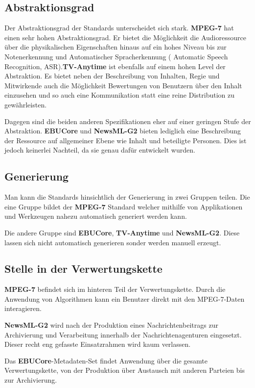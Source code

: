 	\subsection{Abstraktionsgrad}
Der Abstraktionsgrad der Standards unterscheidet sich stark. \textbf{MPEG-7} hat einen sehr hohen Abstraktionsgrad. Er bietet die Möglichkeit die Audioressource über die physikalischen Eigenschaften hinaus auf ein hohes Niveau bis zur Notenerkennung und Automatischer Spracherkennung ( Automatic Speech Recognition, ASR).\textbf{TV-Anytime} ist ebenfalls auf einem hohen Level der Abstraktion. Es bietet neben der Beschreibung von Inhalten, Regie und Mitwirkende auch die Möglichkeit Bewertungen von Benutzern über den Inhalt einzusehen und so auch eine Kommunikation statt eine reine Distribution zu gewährleisten.

	Dagegen sind die beiden anderen Spezifikationen eher auf einer geringen Stufe der Abstraktion. \textbf{EBUCore} und \textbf{NewsML-G2} bieten lediglich eine Beschreibung der Ressource auf allgemeiner Ebene wie Inhalt und beteiligte Personen. Dies ist jedoch keinerlei Nachteil, da sie genau dafür entwickelt wurden.

	\subsection{Generierung}
	Man kann die Standards hinsichtlich der Generierung in zwei Gruppen teilen. Die eine Gruppe bildet der \textbf{MPEG-7} Standard welcher mithilfe von Applikationen und Werkzeugen nahezu automatisch generiert werden kann.
	
	Die andere Gruppe sind \textbf{EBUCore}, \textbf{TV-Anytime} und \textbf{NewsML-G2}. Diese lassen sich nicht automatisch generieren sonder werden manuell erzeugt.

	\subsection{Stelle in der Verwertungskette}
	\textbf{MPEG-7} befindet sich im hinteren Teil der Verwertungskette. Durch die Anwendung von Algorithmen kann ein Benutzer direkt mit den MPEG-7-Daten interagieren. %
	
	\textbf{NewsML-G2} wird nach der Produktion eines Nachrichtenbeitrags zur Archivierung und Verarbeitung innerhalb der Nachrichtenagenturen eingesetzt. Dieser recht eng gefasste Einsatzrahmen wird kaum verlassen.
	
	Das \textbf{EBUCore}-Metadaten-Set findet Anwendung über die gesamte Verwertungskette, von der Produktion über Austausch mit anderen Parteien bis zur Archivierung.
	

